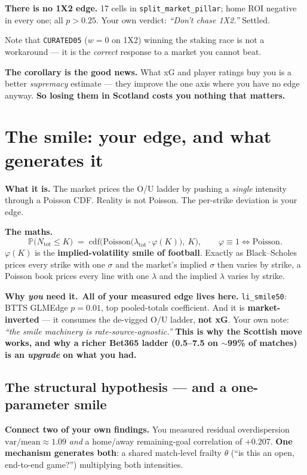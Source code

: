 \documentclass[11pt,a4paper]{article}
\newcommand{\formula}[1]{\smallskip\noindent\textbf{\small The maths.}\ #1}
\newcommand{\whyyou}[1]{\smallskip\noindent\textbf{\small Why \emph{you} need it.}\ \small #1\normalsize}
\begin{document}
\begin{closed}
\textbf{There is no 1X2 edge.} 17 cells in \texttt{split\_market\_pillar}; home ROI negative in every one; all
$p > 0.25$. Your own verdict: \emph{``Don't chase 1X2.''} Settled.

\smallskip
Note that \texttt{CURATED05} ($w = 0$ on 1X2) winning the staking race is not a workaround --- it is the
\emph{correct} response to a market you cannot beat.

\smallskip
\textbf{The corollary is the good news.} What xG and player ratings buy you is a better \emph{supremacy}
estimate --- they improve the one axis where you have no edge anyway. \textbf{So losing them in Scotland
costs you nothing that matters.}
\end{closed}

\section{The smile: your edge, and what generates it}

\textbf{What it is.} The market prices the O/U ladder by pushing a \emph{single} intensity through a Poisson
CDF. Reality is not Poisson. The per-strike deviation is your edge.

\formula{
\[
  \mathbb{P}\big(N_{\text{tot}} \le K\big)
  \;=\; \mathrm{cdf}\Big(\mathrm{Poisson}\big(\lambda_{\text{tot}}\cdot \varphi(K)\big),\ K\Big),
  \qquad \varphi \equiv 1 \iff \text{Poisson}.
\]
$\varphi(K)$ is the \textbf{implied-volatility smile of football}. Exactly as Black--Scholes prices every
strike with one $\sigma$ and the market's implied $\sigma$ then varies by strike, a Poisson book prices every
line with one $\lambda$ and the implied $\lambda$ varies by strike.}

\whyyou{\textbf{All of your measured edge lives here.} \texttt{li\_smile50}: BTTS GLMEdge $p = 0.01$, top
pooled-totals coefficient. And it is \textbf{market-inverted} --- it consumes the de-vigged O/U ladder,
\textbf{not xG}. Your own note: \emph{``the smile machinery is rate-source-agnostic.''} \textbf{This is why
the Scottish move works, and why a richer Bet365 ladder (0.5--7.5 on $\sim$99\% of matches) is an
\emph{upgrade} on what you had.}}

\subsection*{The structural hypothesis --- and a one-parameter smile}

\textbf{Connect two of your own findings.} You measured residual overdispersion $\mathrm{var}/\mathrm{mean}
\approx 1.09$ \emph{and} a home/away remaining-goal correlation of $+0.207$. \textbf{One mechanism generates
both}: a shared match-level frailty $\theta$ (``is this an open, end-to-end game?'') multiplying both
intensities.
\end{document}
